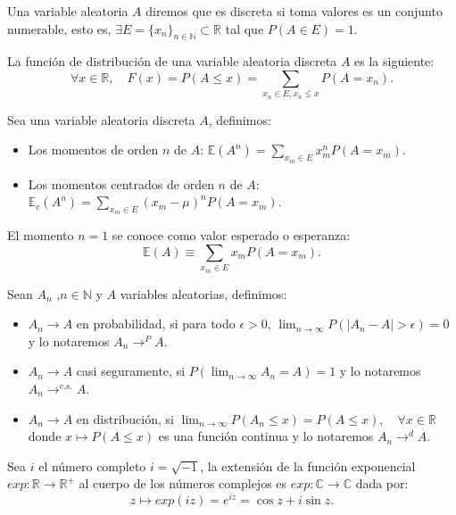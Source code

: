 \documentclass[../proyecto.tex]{memoir}
\begin{document}
\begin{defi}
Una variable aleatoria $A$ diremos que es discreta si toma valores es un conjunto numerable, esto es, $\exists E=\{x_n\}_{n \in \mathds{N}} \subset \mathds{R}$ tal que $P(A \in E)=1$. 
\end{defi}

\begin{defi}
La función de distribución de una variable aleatoria discreta $A$ es la siguiente: $$
\forall x\in \mathds{R}, \quad F(x) = P( A \leq x) = \sum_{x_n\in E, x_n \leq x} P(A=x_n).
$$
\end{defi}

\begin{defi}
Sea una variable aleatoria discreta $A$, definimos:

\begin{itemize}
\item Los momentos de orden $n$ de $A$: $\mathds{E}(A^n) = \sum_{x_m \in E} x_m^n P(A=x_m)$.
\item Los momentos centrados de orden $n$ de $A$: $\mathds{E}_c(A^n) =\sum_{x_m \in E} (x_m - \mu)^n P(A=x_m)$.
\end{itemize}
\end{defi}

El momento $n=1$ se conoce como valor esperado o esperanza: $$
\mathds{E}(A) \equiv \sum_{x_m \in E} x_m P(A=x_m).
$$

\begin{defi}
Sean ${A_n}$ ,$n\in \mathds{N}$ y $A$ variables aleatorias, definimos:
\begin{itemize}
\item $A_n \to A$ en probabilidad, si para todo $\epsilon > 0$, $\lim_{n\to\infty} P( |A_n-A|> \epsilon ) = 0$ y lo notaremos $A_n \to^{P} A$.
\item $A_n \to A$ casi seguramente, si $P(\lim_{n\to\infty} A_n=A) = 1$ y lo notaremos $A_n \to^{c.s.} A$.
\item $A_n \to A$ en distribución, si $\lim_{n \to \infty} P(A_n \leq x) = P(A \leq x),\quad \forall x \in \mathds{R}$ donde $x\mapsto P(A \leq x)$ es una función continua y lo notaremos $A_n \to^{d} A$.
\end{itemize}
\end{defi}

\begin{defi}
Sea $i$ el número completo $i=\sqrt{-1}$, la extensión de la función exponencial $exp: \mathds{R} \to \mathds{R^{+}}$ al cuerpo de los números complejos es $exp: \mathds{C} \to \mathds{C}$ dada por:
$$
z \mapsto exp(iz) = e^{iz}=\cos z+i\sin z.
$$
\end{defi}
\end{document}
